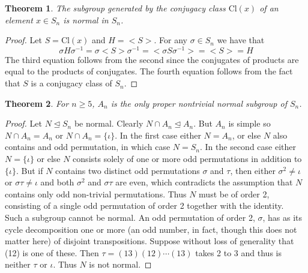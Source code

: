 \documentclass[a4paper,10pt]{article}
\newtheorem{theorem}{Theorem}
\begin{document}
\begin{theorem}
The subgroup generated by the conjugacy class $\textrm{Cl}(x)$ of an element $x \in S_n$ is normal in $S_n$.   
\end{theorem}
\begin{proof}
Let $S = \textrm{Cl}(x)$ and $H = <S>$. For any $\sigma\in S_n$ we have that
\begin{equation}
\sigma H \sigma^{-1} = \sigma <S> \sigma^{-1} = <\sigma S \sigma^{-1}> = <S> = H 
\end{equation}
The third equation follows from the second since the conjugates of products are equal to the products of conjugates. The fourth equation follows from the fact that $S$ is a conjugacy class of $S_n$.
\end{proof}

\begin{theorem}
For $n \geq 5$, $A_n$ is the only proper nontrivial normal subgroup of $S_n$. 
\end{theorem}
\begin{proof}
Let $N \unlhd S_n$ be normal. Clearly $N\cap A_n \unlhd A_n$. But $A_n$ is simple so $N\cap A_n = A_n$ or $N\cap A_n = \{\iota\}$. In the first case either $N=A_n$, or else $N$ also contains and odd permutation, in which case $N=S_n$. In the second case either $N=\{\iota\}$ or else $N$ consists solely of one or more odd permutations in addition to $\{\iota\}$. But if $N$ contains two distinct odd permutations $\sigma$ and $\tau$, then either $\sigma^2 \neq \iota$ or $\sigma \tau \neq \iota$ and both $\sigma^2$ and $\sigma \tau$ are even, which contradicts the assumption that $N$ contains only odd non-trivial permutations. Thus $N$ must be of order 2, consisting of a single odd permutation of order 2 together with the identity. \\

Such a subgroup cannot be normal. An odd permutation of order 2, $\sigma$, has as its cycle decomposition one or more (an odd number, in fact, though this does not matter here) of disjoint transpositions. Suppose without loss of generality that (12) is one of these. Then $\tau = (13)(12)\cdots(13)$ takes 2 to 3 and thus is neither $\tau$ or $\iota$. Thus $N$ is not normal.
\end{proof}
\end{document}
